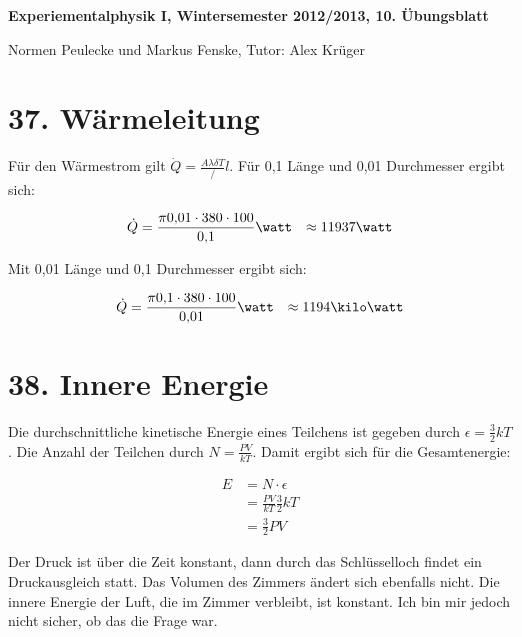 \documentclass[a4paper,german,12pt,smallheadings]{scrartcl}
\begin{document}
\begin{center}
\bfseries %
\sffamily %
\vspace{-40pt}
Experiementalphysik I, Wintersemester 2012/2013, 10. Übungsblatt

Normen Peulecke und Markus Fenske, Tutor: Alex Krüger
\vspace{-10pt}
\end{center}

\section*{37. Wärmeleitung}

Für den Wärmestrom gilt $\dot Q = \frac{A \lambda \delta T}/l$. Für 0{,}1
\meter Länge und 0{,}01 \meter Durchmesser ergibt sich:

\begin{align*}
  \dot Q &= \frac{\pi 0{,}01 \cdot 380 \cdot 100}{0{,}1} \watt
         &\approx 11937 \watt
\end{align*}

Mit 0{,}01 \meter Länge und 0{,}1 \meter Durchmesser ergibt sich:

\begin{align*}
  \dot Q &= \frac{\pi 0{,}1 \cdot 380 \cdot 100}{0{,}01} \watt
         &\approx 1194 \kilo\watt
\end{align*}

\section*{38. Innere Energie}

Die durchschnittliche kinetische Energie eines Teilchens ist gegeben durch
$\epsilon = \frac{3}{2} kT$. Die Anzahl der Teilchen durch $N = \frac{PV}{kT}$.
Damit ergibt sich für die Gesamtenergie:

\begin{align*}
  E &= N \cdot \epsilon \\
    &= \frac{PV}{kT} \frac{3}{2} kT \\
    &= \frac{3}{2} PV
\end{align*}

Der Druck ist über die Zeit konstant, dann durch das Schlüsselloch findet ein
Druckausgleich statt. Das Volumen des Zimmers ändert sich ebenfalls nicht. Die
innere Energie der Luft, die im Zimmer verbleibt, ist konstant. Ich bin mir
jedoch nicht sicher, ob das die Frage war.
\end{document}
